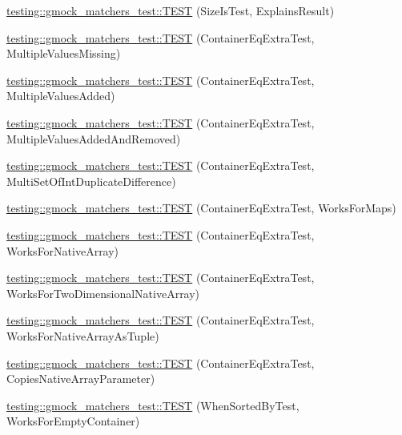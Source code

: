 \begin{DoxyCompactItemize}
\hyperlink{namespacetesting_1_1gmock__matchers__test_a6c218845fd345302c490ef53f0d36995}{testing\+::gmock\+\_\+matchers\+\_\+test\+::\+T\+E\+ST} (Size\+Is\+Test, Explains\+Result)
\item 
\hyperlink{namespacetesting_1_1gmock__matchers__test_ab84ac6cfde20f21ed69d5d7aa882ea1b}{testing\+::gmock\+\_\+matchers\+\_\+test\+::\+T\+E\+ST} (Container\+Eq\+Extra\+Test, Multiple\+Values\+Missing)
\item 
\hyperlink{namespacetesting_1_1gmock__matchers__test_acc28beb0f3d3fbd8923bad7eb08ce6a6}{testing\+::gmock\+\_\+matchers\+\_\+test\+::\+T\+E\+ST} (Container\+Eq\+Extra\+Test, Multiple\+Values\+Added)
\item 
\hyperlink{namespacetesting_1_1gmock__matchers__test_acb0d845f828c2d5a551e4db0611f2853}{testing\+::gmock\+\_\+matchers\+\_\+test\+::\+T\+E\+ST} (Container\+Eq\+Extra\+Test, Multiple\+Values\+Added\+And\+Removed)
\item 
\hyperlink{namespacetesting_1_1gmock__matchers__test_a6bce9564bb713ffb690b776e35d2e6cf}{testing\+::gmock\+\_\+matchers\+\_\+test\+::\+T\+E\+ST} (Container\+Eq\+Extra\+Test, Multi\+Set\+Of\+Int\+Duplicate\+Difference)
\item 
\hyperlink{namespacetesting_1_1gmock__matchers__test_ab7bcbeeeb23094cff6f2882304c05134}{testing\+::gmock\+\_\+matchers\+\_\+test\+::\+T\+E\+ST} (Container\+Eq\+Extra\+Test, Works\+For\+Maps)
\item 
\hyperlink{namespacetesting_1_1gmock__matchers__test_ae5e5420340c8cf91d24af11feca669b0}{testing\+::gmock\+\_\+matchers\+\_\+test\+::\+T\+E\+ST} (Container\+Eq\+Extra\+Test, Works\+For\+Native\+Array)
\item 
\hyperlink{namespacetesting_1_1gmock__matchers__test_a3cf0d2f2c08e34ca0b7e11ff27b4a7ca}{testing\+::gmock\+\_\+matchers\+\_\+test\+::\+T\+E\+ST} (Container\+Eq\+Extra\+Test, Works\+For\+Two\+Dimensional\+Native\+Array)
\item 
\hyperlink{namespacetesting_1_1gmock__matchers__test_a94e4a2a02cde84ac51e37cda1813bc77}{testing\+::gmock\+\_\+matchers\+\_\+test\+::\+T\+E\+ST} (Container\+Eq\+Extra\+Test, Works\+For\+Native\+Array\+As\+Tuple)
\item 
\hyperlink{namespacetesting_1_1gmock__matchers__test_af7a978384d567d133240fb1899ec1658}{testing\+::gmock\+\_\+matchers\+\_\+test\+::\+T\+E\+ST} (Container\+Eq\+Extra\+Test, Copies\+Native\+Array\+Parameter)
\item 
\hyperlink{namespacetesting_1_1gmock__matchers__test_a9d88fbc6e2d01b66a1c10b192b25a802}{testing\+::gmock\+\_\+matchers\+\_\+test\+::\+T\+E\+ST} (When\+Sorted\+By\+Test, Works\+For\+Empty\+Container)

\end{DoxyCompactItemize}
